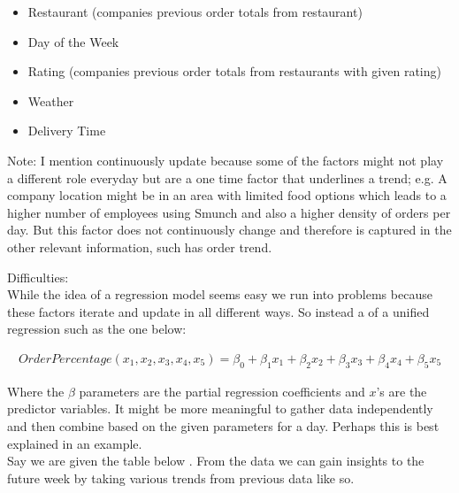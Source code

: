 \documentclass[12pt]{article}
\newcommand{\ban}[1]{ \begin{align*}#1\end{align*} }
\begin{document}
\begin{itemize}
  \item Restaurant (companies previous order totals from restaurant)
  \item Day of the Week
  \item Rating (companies previous order totals from restaurants with given rating)
  \item Weather
  \item Delivery Time
\end{itemize}
\vspace{0.25cm}

Note: \small I mention continuously update because some of the factors might not play a different role everyday but are a one time factor that underlines a trend; e.g. A company location might be in an area with limited food options which leads to a higher number of employees using Smunch and also a higher density of orders per day. But this factor does not continuously change and therefore is captured in the other relevant information, such has order trend.

\vspace{.5cm}
Difficulties:\\
    While the idea of a regression model seems easy we run into problems because these factors iterate and update in all different ways. So instead a of a unified regression such as the one below:
    
\ban{
Order Percentage(x_1, x_2, x_3, x_4, x_5) = \beta_0 + \beta_1 x_1 + \beta_2 x_2 + \beta_3 x_3 + \beta_4 x_4 + \beta_5 x_5
}

\vspace{0.25cm}
Where the $\beta$ parameters are the partial regression coefficients and $x$'s are the predictor variables. It might be more meaningful to gather data independently and then combine based on the given parameters for a day. Perhaps this is best explained in an example.\\

Say we are given the table below \label{table:1}. From the data we can gain insights to the future week by taking various trends from previous data like so.
\end{document}
